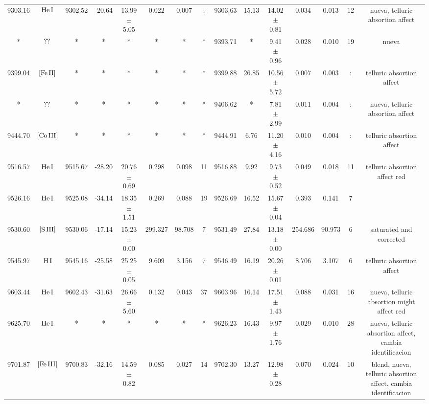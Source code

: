 \documentclass{article}
\begin{document}
\begin{table*}
\begin{adjustbox}{width=\textwidth}
\begin{tabular}{ccccccccccccccc}
9303.16 & $\mbox{He}\thinspace \mbox{I}$ & 9302.52 & -20.64 & 13.99 $\pm$ 5.05 & 0.022 & 0.007 & : & 9303.63 & 15.13 & 14.02 $\pm$ 0.81 & 0.034 & 0.013 & 12 &  nueva, telluric absortion affect \\
* & $\mbox{??}\thinspace \mbox{}$ & * & * & * & * & * & * & 9393.71 & * & 9.41 $\pm$ 0.96 & 0.028 & 0.010 & 19 &  nueva \\
9399.04 & $\mbox{[Fe}\thinspace \mbox{II]}$ & * & * & * & * & * & * & 9399.88 & 26.85 & 10.56 $\pm$ 5.72 & 0.007 & 0.003 & : &  telluric absortion affect \\
* & $\mbox{??}\thinspace \mbox{}$ & * & * & * & * & * & * & 9406.62 & * & 7.81 $\pm$ 2.99 & 0.011 & 0.004 & : &  nueva, telluric absortion affect \\
9444.70 & $\mbox{[Co}\thinspace \mbox{III]}$ & * & * & * & * & * & * & 9444.91 & 6.76 & 11.20 $\pm$ 4.16 & 0.010 & 0.004 & : &  telluric absortion affect \\
9516.57 & $\mbox{He}\thinspace \mbox{I}$ & 9515.67 & -28.20 & 20.76 $\pm$ 0.69 & 0.298 & 0.098 & 11 & 9516.88 & 9.92 & 9.73 $\pm$ 0.52 & 0.049 & 0.018 & 11 &  telluric absortion affect red \\
9526.16 & $\mbox{He}\thinspace \mbox{I}$ & 9525.08 & -34.14 & 18.35 $\pm$ 1.51 & 0.269 & 0.088 & 19 & 9526.69 & 16.52 & 15.67 $\pm$ 0.04 & 0.393 & 0.141 & 7 &  \\
9530.60 & $\mbox{[S}\thinspace \mbox{III]}$ & 9530.06 & -17.14 & 15.23 $\pm$ 0.00 & 299.327 & 98.708 & 7 & 9531.49 & 27.84 & 13.18 $\pm$ 0.00 & 254.686 & 90.973 & 6 &  saturated and corrected \\
9545.97 & $\mbox{H}\thinspace \mbox{I}$ & 9545.16 & -25.58 & 25.25 $\pm$ 0.05 & 9.609 & 3.156 & 7 & 9546.49 & 16.19 & 20.26 $\pm$ 0.01 & 8.706 & 3.107 & 6 &  telluric absortion affect \\
9603.44 & $\mbox{He}\thinspace \mbox{I}$ & 9602.43 & -31.63 & 26.66 $\pm$ 5.60 & 0.132 & 0.043 & 37 & 9603.96 & 16.14 & 17.51 $\pm$ 1.43 & 0.088 & 0.031 & 16 &  nueva, telluric absortion might affect red \\
9625.70 & $\mbox{He}\thinspace \mbox{I}$ & * & * & * & * & * & * & 9626.23 & 16.43 & 9.97 $\pm$ 1.76 & 0.029 & 0.010 & 28 &  nueva, telluric absortion affect, cambia identificacion \\
9701.87 & $\mbox{[Fe}\thinspace \mbox{III]}$ & 9700.83 & -32.16 & 14.59 $\pm$ 0.82 & 0.085 & 0.027 & 14 & 9702.30 & 13.27 & 12.98 $\pm$ 0.28 & 0.070 & 0.024 & 10 &  blend, nueva, telluric absortion affect, cambia identificacion \\

\end{tabular}
\end{adjustbox}
\end{table*}
\end{document}
